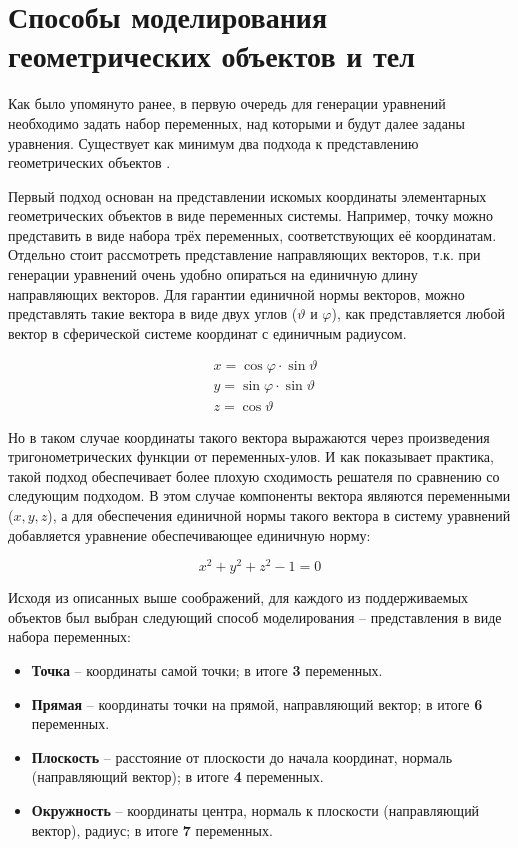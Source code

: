 \section{Способы моделирования геометрических объектов и тел}
Как было упомянуто ранее, в первую очередь для генерации уравнений необходимо задать набор переменных, над которыми и будут далее заданы уравнения. Существует как минимум два подхода к представлению геометрических объектов \cite{ershov2007algorithms}. 

Первый подход основан на представлении искомых координаты элементарных геометрических объектов в виде переменных системы. Например, точку можно представить в виде набора трёх переменных, соответствующих её координатам. Отдельно стоит рассмотреть представление направляющих векторов, т.к. при генерации уравнений очень удобно опираться на единичную длину направляющих векторов. Для гарантии единичной нормы векторов, можно представлять такие вектора в виде двух углов ($\vartheta$ и $\varphi$), как представляется любой вектор в сферической системе координат с единичным радиусом. 

\begin{equation*}
    \begin{matrix}
        & x  = \cos{\varphi} \cdot \sin{\vartheta} \\ 
        & y  = \sin\varphi \cdot \sin\vartheta \\
        & z  = \cos\vartheta
    \end{matrix}
\end{equation*}

Но в таком случае координаты такого вектора выражаются через произведения тригонометрических функции от переменных-улов. И как показывает практика, такой подход обеспечивает более плохую сходимость решателя по сравнению со следующим подходом. В этом случае компоненты вектора являются переменными ($x, y, z$), а для обеспечения единичной нормы такого вектора в систему уравнений добавляется уравнение обеспечивающее единичную норму:  

\begin{equation*}
    x^2 + y^2 + z^2 - 1 = 0
\end{equation*}

Исходя из описанных выше соображений, для каждого из поддерживаемых объектов был выбран следующий способ моделирования -- представления в виде набора переменных:

\begin{itemize}
    \item
        \textbf{Точка} -- координаты самой точки; в итоге \textbf{3} переменных.
    \item
        \textbf{Прямая} -- координаты точки на прямой, направляющий вектор; в итоге \textbf{6} переменных.
    \item
        \textbf{Плоскость} -- расстояние от плоскости до начала координат, нормаль (направляющий вектор); в итоге \textbf{4} переменных.
    \item
        \textbf{Окружность} -- координаты центра, нормаль к плоскости (направляющий вектор), радиус; в итоге \textbf{7} переменных.
\end{itemize}

